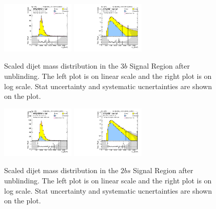 \begin{figure}[htbp!]
\begin{center}
\includegraphics[width=0.31\textwidth,angle=-90]{figures/boosted/Signal_Syst/Moriond_bkg_9_ThreeTag_Signal_mHH_pole.pdf}
\includegraphics[width=0.31\textwidth,angle=-90]{figures/boosted/Signal_Syst/Moriond_bkg_9_ThreeTag_Signal_mHH_pole_1.pdf}  
  \caption{Scaled dijet mass distribution in the $3b$ Signal Region after unblinding. The left plot is on linear scale and the right plot is on log scale. Stat uncertainty and systematic ucnertainties are shown on the plot.}
  \label{fig:boosted-3b-signal-pole}
\end{center}
\end{figure}

\begin{figure}[htbp!]
\begin{center}
\includegraphics[width=0.31\textwidth,angle=-90]{figures/boosted/Signal_Syst/Moriond_bkg_9_TwoTag_split_Signal_mHH_pole.pdf}
\includegraphics[width=0.31\textwidth,angle=-90]{figures/boosted/Signal_Syst/Moriond_bkg_9_TwoTag_split_Signal_mHH_pole_1.pdf}  
  \caption{Scaled dijet mass distribution in the $2bs$ Signal Region after unblinding. The left plot is on linear scale and the right plot is on log scale. Stat uncertainty and systematic ucnertainties are shown on the plot.}
  \label{fig:boosted-2b-signal-pole}
\end{center}
\end{figure}

